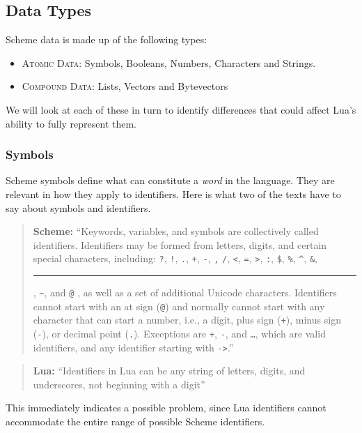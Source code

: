\subsection{Data Types}

Scheme data is made up of the following
types:~\cite[Appendix~(Formal~Syntax)]{tspl}
\begin{itemize}
\item \textsc{Atomic Data}: Symbols, Booleans, Numbers, Characters and Strings.
\item \textsc{Compound Data}: Lists, Vectors and Bytevectors
\end{itemize}

We will look at each of these in turn to identify differences that could affect
Lua's ability to fully represent them.

\subsubsection{Symbols}

Scheme symbols define what can constitute a \emph{word} in the language. They
are relevant in how they apply to identifiers. Here is what two of the texts
have to say about symbols and identifiers.

\begin{quotation}\textbf{Scheme:}
``Keywords, variables, and symbols are collectively called identifiers.
Identifiers may be formed from letters, digits, and certain special characters,
including: \texttt ?, \texttt !, \texttt ., \texttt +, \texttt -, \texttt *,
\texttt /, \texttt <, \texttt =, \texttt >, \texttt :, \texttt \$, \texttt \%,
\texttt \^{}, \texttt \&, \rule{3mm}{0.2mm}, \texttt \~{}, and \texttt @ , as
well as a set of additional Unicode characters.  Identifiers cannot start with
an at sign (\texttt @) and normally cannot start with any character that can
start a number, i.e., a digit, plus sign (\texttt +), minus sign (\texttt -), or
decimal point (\texttt .). Exceptions are \texttt +, \texttt -, and \texttt
\ldots, which are valid identifiers, and any identifier starting with
\texttt{->}.''~\cite[Sec~1.1]{tspl}
\end{quotation}

\begin{quotation}\textbf{Lua:}
``Identifiers in Lua can be any string of letters, digits, and
underscores, not beginning with a digit''~\cite[p.5]{luabook}
\end{quotation}

This immediately indicates a possible problem, since Lua identifiers cannot
accommodate the entire range of possible Scheme identifiers.

